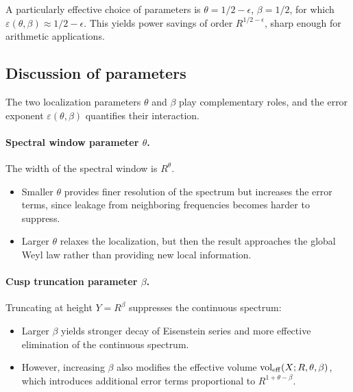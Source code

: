 A particularly effective choice of parameters is $\theta=1/2-\epsilon$,
$\beta=1/2$, for which $\varepsilon(\theta,\beta)\approx 1/2-\epsilon$. This yields power
savings of order $R^{1/2-\epsilon}$, sharp enough for arithmetic applications.

\subsection{Discussion of parameters}\label{subsec:params}

The two localization parameters $\theta$ and $\beta$ play complementary roles, and the
error exponent $\varepsilon(\theta,\beta)$ quantifies their interaction.

\paragraph{Spectral window parameter $\theta$.}
The width of the spectral window is $R^\theta$.  
\begin{itemize}
  \item Smaller $\theta$ provides finer resolution of the spectrum but increases the error
        terms, since leakage from neighboring frequencies becomes harder to suppress.
  \item Larger $\theta$ relaxes the localization, but then the result approaches the global
        Weyl law rather than providing new local information.
\end{itemize}

\paragraph{Cusp truncation parameter $\beta$.}
Truncating at height $Y=R^\beta$ suppresses the continuous spectrum:
\begin{itemize}
  \item Larger $\beta$ yields stronger decay of Eisenstein series and more effective
        elimination of the continuous spectrum.
  \item However, increasing $\beta$ also modifies the effective volume
        $\operatorname{vol}_{\mathrm{eff}}(X;R,\theta,\beta)$, which introduces additional error terms
        proportional to $R^{1+\theta-\beta}$.
\end{itemize}


